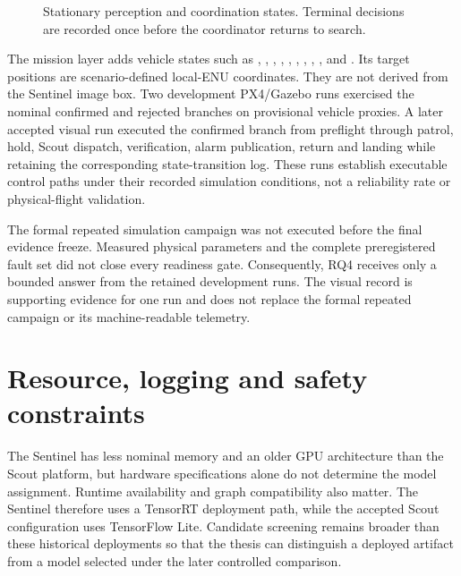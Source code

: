 \begin{figure}[H]
  \centering
  \resizebox{\textwidth}{!}{}
  \caption{Stationary perception and coordination states. Terminal decisions
  are recorded once before the coordinator returns to search.}
  \label{fig:coordination-states}
\end{figure}

The mission layer adds vehicle states such as ,
, , ,
, ,
, , ,
 and . Its target positions are scenario-defined
local-ENU coordinates. They are not derived from the Sentinel image box. Two
development PX4/Gazebo runs exercised the nominal confirmed and rejected
branches on provisional vehicle proxies. A later accepted visual run executed
the confirmed branch from preflight through patrol, hold, Scout dispatch,
verification, alarm publication, return and landing while retaining the
corresponding state-transition log. These runs establish executable control
paths under their recorded simulation conditions, not a reliability rate or
physical-flight validation.

The formal repeated simulation campaign was not executed before the final
evidence freeze. Measured physical parameters and the complete preregistered
fault set did not close every readiness gate. Consequently, RQ4 receives only
a bounded answer from the retained development runs. The visual record is
supporting evidence for one run and does not replace the formal repeated
campaign or its machine-readable telemetry.

\section{Resource, logging and safety constraints}
\label{sec:architecture:constraints}

The Sentinel has less nominal memory and an older GPU architecture than the
Scout platform, but hardware specifications alone do not determine the model
assignment. Runtime availability and graph compatibility also matter. The
Sentinel therefore uses a TensorRT deployment path, while the accepted Scout
configuration uses TensorFlow Lite. Candidate screening remains broader than
these historical deployments so that the thesis can distinguish a deployed
artifact from a model selected under the later controlled comparison.

